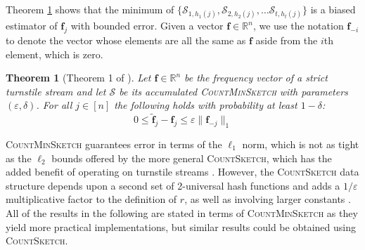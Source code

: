 \documentclass[10]{report}
\newtheorem{theorem}{Theorem}[section]
\newcommand{\algoname}[1]{\textnormal{\textsc{#1}}}
\begin{document}
Theorem \ref{thm:cms:err} shows that the minimum of $\{\mathcal{S}_{1,h_1(j)}, \mathcal{S}_{2,h_2(j)}, \dots \mathcal{S}_{t,h_t(j)}\}$ is a biased estimator of $\mathbf{f}_j$ with bounded error.
Given a vector $\mathbf{f} \in \mathbb{R}^n$, we use the notation $\mathbf{f}_{-i}$ to denote the vector whose elements are all the same as $\mathbf{f}$ aside from the $i$th element, which is zero.
%
\begin{theorem}[Theorem 1 of \cite{cormode2005improved}] \label{thm:cms:err}
Let $\mathbf{f} \in \mathbb{R}^n$ be the frequency vector of a strict turnstile stream and let $\mathcal{S}$ be its accumulated \algoname{CountMinSketch} with parameters $(\varepsilon, \delta)$.
For all $j \in [n]$ the following holds with probability at least $1-\delta$:
%
\begin{equation*}
0 \leq \widetilde{\mathbf{f}}_j - \mathbf{f}_j \leq \varepsilon \|\mathbf{f}_{-j}\|_1
\end{equation*}
%
\end{theorem}
%

\algoname{CountMinSketch} guarantees error in terms of the $\ell_1$ norm, which is not as tight as the $\ell_2$ bounds offered by the more general \algoname{CountSketch}, which has the added benefit of operating on turnstile streams \cite{charikar2002finding}. 
However, the \algoname{CountSketch} data structure depends upon a second set of 2-universal hash functions and adds a $1/\varepsilon$ multiplicative factor to the definition of $r$, as well as involving larger constants \cite{cormode2005improved}.
All of the results in the following are stated in terms of \algoname{CountMinSketch} as they yield more practical implementations, but similar results could be obtained using \algoname{CountSketch}.
\end{document}
